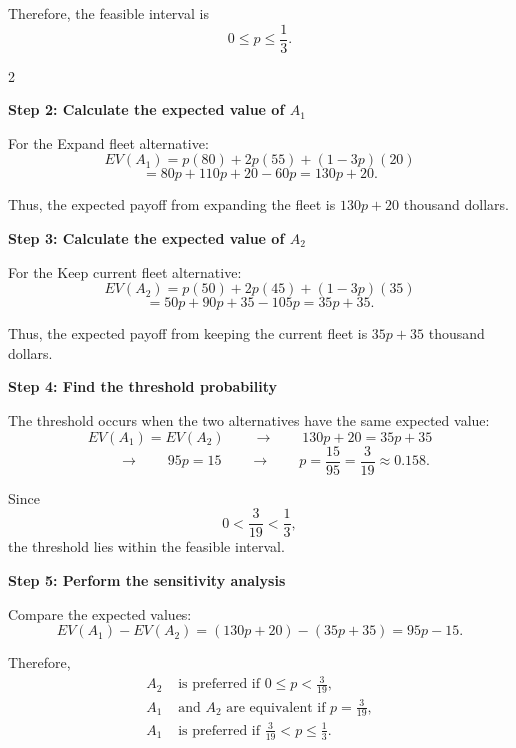 	Therefore, the feasible interval is
	\[
	0\leq p\leq\frac13.
	\]
	
	\vspace{-3mm}
	
	\noindent
	\setlength{\columnseprule}{0.4pt}
	\begin{multicols}{2}
		\vspace{0pt}
		
		\textbf{Step 2: Calculate the expected value of $A_1$}
		
		For the Expand fleet alternative:
		\[
		EV(A_1)
		=
		p(80)+2p(55)+(1-3p)(20)
		\]
		\[
		=
		80p+110p+20-60p
		=
		130p+20.
		\]
		
		Thus, the expected payoff from expanding the fleet is
		$130p+20$ thousand dollars.
		
		\columnbreak
		
		\textbf{Step 3: Calculate the expected value of $A_2$}
		
		For the Keep current fleet alternative:
		\[
		EV(A_2)
		=
		p(50)+2p(45)+(1-3p)(35)
		\]
		\[
		=
		50p+90p+35-105p
		=
		35p+35.
		\]
		
		Thus, the expected payoff from keeping the current fleet is
		$35p+35$ thousand dollars.
		
	\end{multicols}
	
	
	\setlength{\columnseprule}{0pt}
	
	\textbf{Step 4: Find the threshold probability}
	
	The threshold occurs when the two alternatives have the same expected value:
	\[
	EV(A_1)=EV(A_2)
	\qquad\longrightarrow\qquad
	130p+20=35p+35
	\]
	\[
	\qquad\longrightarrow\qquad
	95p=15
	\qquad\longrightarrow\qquad
	p=\frac{15}{95}
	=\frac{3}{19}
	\approx0.158.
	\]
	
	Since
	\[
	0<\frac{3}{19}<\frac13,
	\]
	the threshold lies within the feasible interval.
	
	\textbf{Step 5: Perform the sensitivity analysis}
	
	Compare the expected values:
	\[
	EV(A_1)-EV(A_2)
	=
	(130p+20)-(35p+35)
	=
	95p-15.
	\]
	
	Therefore,
	\[
	\boxed{
		\begin{aligned}
			A_2 &\text{ is preferred if } 0\leq p<\frac{3}{19},\\
			A_1 &\text{ and }A_2\text{ are equivalent if }p=\frac{3}{19},\\
			A_1 &\text{ is preferred if }\frac{3}{19}<p\leq\frac13.
		\end{aligned}
	}
	\]
	
